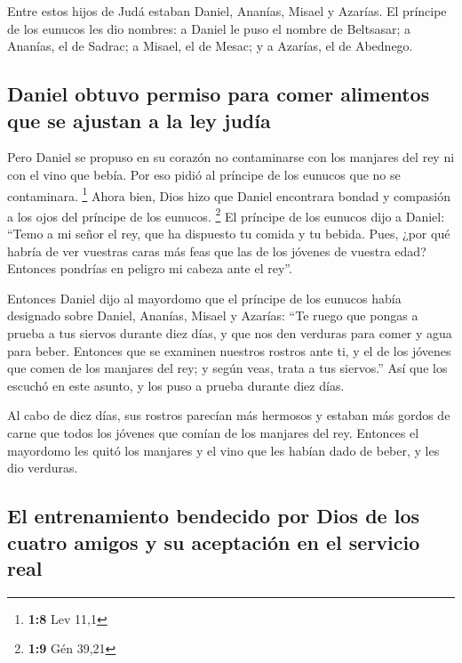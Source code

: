 \begin{paracol}{2}
 Entre estos hijos de Judá estaban Daniel, Ananías, Misael
y Azarías.  El príncipe de los eunucos les dio nombres: a
Daniel le puso el nombre de Beltsasar; a Ananías, el de Sadrac; a
Misael, el de Mesac; y a Azarías, el de Abednego.

\hypertarget{daniel-obtuvo-permiso-para-comer-alimentos-que-se-ajustan-a-la-ley-juduxeda}{%
\subsection{Daniel obtuvo permiso para comer alimentos que se ajustan a
la ley
judía}\label{daniel-obtuvo-permiso-para-comer-alimentos-que-se-ajustan-a-la-ley-juduxeda}}

 Pero Daniel se propuso en su corazón no contaminarse con
los manjares del rey ni con el vino que bebía. Por eso pidió al príncipe
de los eunucos que no se contaminara. \footnote{\textbf{1:8} Lev 11,1}
 Ahora bien, Dios hizo que Daniel encontrara bondad y
compasión a los ojos del príncipe de los eunucos. \footnote{\textbf{1:9}
  Gén 39,21}  El príncipe de los eunucos dijo a Daniel:
``Temo a mi señor el rey, que ha dispuesto tu comida y tu bebida. Pues,
¿por qué habría de ver vuestras caras más feas que las de los jóvenes de
vuestra edad? Entonces pondrías en peligro mi cabeza ante el rey''.

 Entonces Daniel dijo al mayordomo que el príncipe de los
eunucos había designado sobre Daniel, Ananías, Misael y Azarías:
 ``Te ruego que pongas a prueba a tus siervos durante
diez días, y que nos den verduras para comer y agua para beber.
 Entonces que se examinen nuestros rostros ante ti, y el
de los jóvenes que comen de los manjares del rey; y según veas, trata a
tus siervos.''  Así que los escuchó en este asunto, y los
puso a prueba durante diez días.

 Al cabo de diez días, sus rostros parecían más hermosos
y estaban más gordos de carne que todos los jóvenes que comían de los
manjares del rey.  Entonces el mayordomo les quitó los
manjares y el vino que les habían dado de beber, y les dio verduras.

\hypertarget{el-entrenamiento-bendecido-por-dios-de-los-cuatro-amigos-y-su-aceptaciuxf3n-en-el-servicio-real}{%
\subsection{El entrenamiento bendecido por Dios de los cuatro amigos y
su aceptación en el servicio
real}\label{el-entrenamiento-bendecido-por-dios-de-los-cuatro-amigos-y-su-aceptaciuxf3n-en-el-servicio-real}}


\end{paracol}
